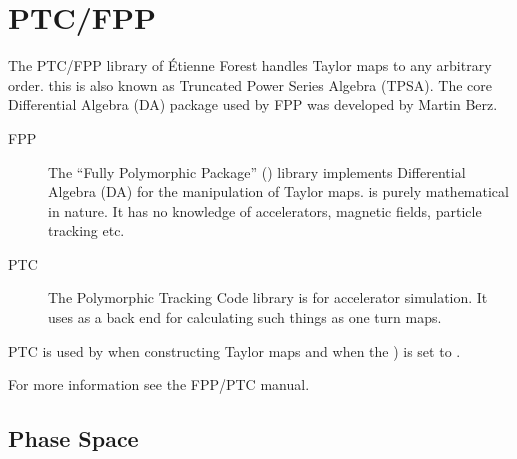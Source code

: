 \chapter{PTC/FPP}
\label{c:ptc}

The PTC/FPP library of \'Etienne
Forest handles Taylor maps to any arbitrary order. this is also known as Truncated Power
Series Algebra (TPSA). The core Differential Algebra (DA) package used by FPP was
developed by Martin Berz\cite{b:berz}.  

\begin{description}
\item[FPP] \Newline
The ``Fully Polymorphic Package'' () library implements Differential Algebra (DA)
for the manipulation of Taylor maps.  is purely mathematical in nature. It has no
knowledge of accelerators, magnetic fields, particle tracking etc.

\item[PTC] \Newline
The Polymorphic Tracking Code  library is for accelerator simulation. It uses
 as a back end for calculating such things as one turn maps.
\end{description}

PTC is used by \bmad when constructing Taylor maps and when the 
) is set to .

For more information see the FPP/PTC manual\cite{b:ptc}.

\section{Phase Space}
\label{s:ptc.space}

